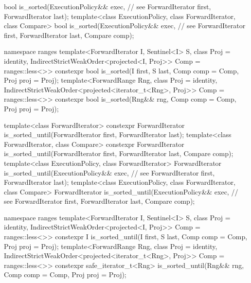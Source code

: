 \begin{codeblock}
    bool is_sorted(ExecutionPolicy&& exec, // see 
                   ForwardIterator first, ForwardIterator last);
  template<class ExecutionPolicy, class ForwardIterator, class Compare>
    bool is_sorted(ExecutionPolicy&& exec, // see 
                   ForwardIterator first, ForwardIterator last,
                   Compare comp);
\end{codeblock}\begin{addedblock}\begin{codeblock}
  namespace ranges {
    template<ForwardIterator I, Sentinel<I> S, class Proj = identity,
        IndirectStrictWeakOrder<projected<I, Proj>> Comp = ranges::less<>>
      constexpr bool is_sorted(I first, S last, Comp comp = Comp{}, Proj proj = Proj{});
    template<ForwardRange Rng, class Proj = identity,
        IndirectStrictWeakOrder<projected<iterator_t<Rng>, Proj>> Comp = ranges::less<>>
      constexpr bool is_sorted(Rng&& rng, Comp comp = Comp{}, Proj proj = Proj{});
  }
\end{codeblock}\end{addedblock}\begin{codeblock}
  template<class ForwardIterator>
    constexpr ForwardIterator
      is_sorted_until(ForwardIterator first, ForwardIterator last);
  template<class ForwardIterator, class Compare>
    constexpr ForwardIterator
      is_sorted_until(ForwardIterator first, ForwardIterator last,
                      Compare comp);
  template<class ExecutionPolicy, class ForwardIterator>
    ForwardIterator
      is_sorted_until(ExecutionPolicy&& exec, // see 
                      ForwardIterator first, ForwardIterator last);
  template<class ExecutionPolicy, class ForwardIterator, class Compare>
    ForwardIterator
      is_sorted_until(ExecutionPolicy&& exec, // see 
                      ForwardIterator first, ForwardIterator last,
                      Compare comp);
\end{codeblock}\begin{addedblock}\begin{codeblock}
  namespace ranges {
    template<ForwardIterator I, Sentinel<I> S, class Proj = identity,
        IndirectStrictWeakOrder<projected<I, Proj>> Comp = ranges::less<>>
      constexpr I is_sorted_until(I first, S last, Comp comp = Comp{}, Proj proj = Proj{});
    template<ForwardRange Rng, class Proj = identity,
        IndirectStrictWeakOrder<projected<iterator_t<Rng>, Proj>> Comp = ranges::less<>>
      constexpr safe_iterator_t<Rng>
        is_sorted_until(Rng&& rng, Comp comp = Comp{}, Proj proj = Proj{});
  }
\end{codeblock}\end{addedblock}\begin{codeblock}


\end{codeblock}
